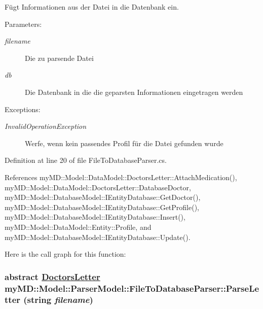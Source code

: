 F\"{u}gt Informationen aus der Datei in die Datenbank ein. 

\begin{Desc}
\item[Parameters:]
\begin{description}
\item[{\em filename}]Die zu parsende Datei\item[{\em db}]Die Datenbank in die die geparsten Informationen eingetragen werden\end{description}
\end{Desc}
\begin{Desc}
\item[Exceptions:]
\begin{description}
\item[{\em Invalid\-Operation\-Exception}]Werfe, wenn kein passendes Profil f\"{u}r die Datei gefunden wurde\end{description}
\end{Desc}


Definition at line 20 of file File\-To\-Database\-Parser.cs.

References my\-MD::Model::Data\-Model::Doctors\-Letter::Attach\-Medication(), my\-MD::Model::Data\-Model::Doctors\-Letter::Database\-Doctor, my\-MD::Model::Database\-Model::IEntity\-Database::Get\-Doctor(), my\-MD::Model::Database\-Model::IEntity\-Database::Get\-Profile(), my\-MD::Model::Database\-Model::IEntity\-Database::Insert(), my\-MD::Model::Data\-Model::Entity::Profile, and my\-MD::Model::Database\-Model::IEntity\-Database::Update().

Here is the call graph for this function:\hypertarget{classmy_m_d_1_1_model_1_1_parser_model_1_1_file_to_database_parser_d8ae1d1ef5060c24906a67b82f7b3329}{
\subsubsection[ParseLetter]{\setlength{\rightskip}{0pt plus 5cm}abstract \hyperlink{classmy_m_d_1_1_model_1_1_data_model_1_1_doctors_letter}{Doctors\-Letter} my\-MD::Model::Parser\-Model::File\-To\-Database\-Parser::Parse\-Letter (string {\em filename})}}
\label{df/d8f/classmy_m_d_1_1_model_1_1_parser_model_1_1_file_to_database_parser_d8ae1d1ef5060c24906a67b82f7b3329}


